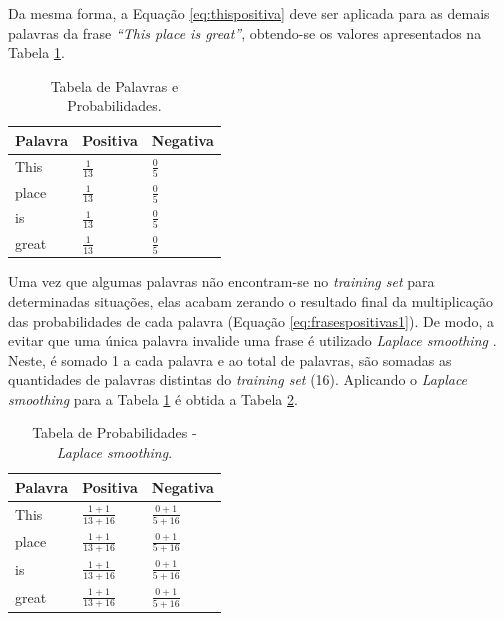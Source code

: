 Da mesma forma, a Equação \ref{eq:thispositiva} deve ser aplicada para as demais
palavras da frase \textit{``This place is great''}, obtendo-se os valores
apresentados na Tabela \ref{tab:probabilidadesnb}.

\begin{table}[htb]
\centering
\renewcommand{\arraystretch}{1.5}%
\begin{tabular}{lll}
\hline

Palavra & Positiva & Negativa \\ \hline
This & \large $\frac{1}{13}$ & \large $\frac{0}{5}$ \\
place & \large $\frac{1}{13}$ & \large $\frac{0}{5}$ \\
is & \large $\frac{1}{13}$ & \large $\frac{0}{5}$ \\
great & \large $\frac{1}{13}$ & \large $\frac{0}{5}$ \\
\end{tabular}
\caption{Tabela de Palavras e Probabilidades.}
\label{tab:probabilidadesnb}
\end{table}

Uma vez que algumas palavras não encontram-se no \textit{training set}
para determinadas situações, elas acabam zerando o resultado final da
multiplicação das probabilidades de cada palavra (Equação
\ref{eq:frasespositivas1}). De modo, a evitar que uma única palavra
invalide uma frase é utilizado \textit{Laplace smoothing} \cite{Manning:2008:IIR:1394399}. Neste, é
somado 1 a cada palavra e ao total de palavras, são somadas as quantidades de
palavras distintas do \textit{training set} (16). Aplicando o
\textit{Laplace smoothing} para a Tabela \ref{tab:probabilidadesnb} é obtida a
Tabela \ref{tab:probabilidadesl}.


\begin{table}[htb]
\centering
\renewcommand{\arraystretch}{1.5}%
\begin{tabular}{lll}
\hline

Palavra & Positiva & Negativa \\ \hline
This & \large $\frac{1 + 1}{13 + 16}$ & \large $\frac{0 + 1}{5 + 16}$ \\
place & \large $\frac{1 + 1}{13 + 16}$ & \large $\frac{0 + 1}{5 + 16}$ \\
is & \large $\frac{1 + 1}{13 + 16}$ & \large $\frac{0 + 1}{5 + 16}$ \\
great & \large $\frac{1 + 1}{13 + 16}$ & \large $\frac{0 + 1}{5 + 16}$ \\
\end{tabular}
\caption{Tabela de Probabilidades - \textit{Laplace smoothing}.}
\label{tab:probabilidadesl}
\end{table}

